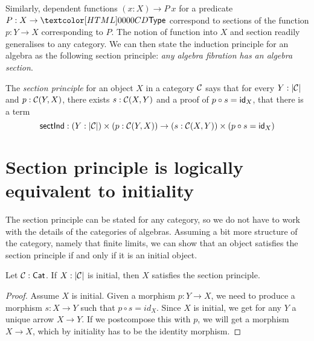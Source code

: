Similarly, dependent functions $(x : X) \to P\ x$ for a predicate
$P : X \to \Type$ correspond to sections of the function $p : Y \to X$
corresponding to $P$. The notion of function into $X$ and section
readily generalises to any category. We can then state the induction
principle for an algebra as the following section principle: \emph{any
  algebra fibration has an algebra section}.

\begin{definition}
  The \emph{section principle} for an object $X$ in a category $\mathcal{C}$
  says that for every $Y : | \mathcal{C} |$ and $p : \mathcal{C}(Y,X)$, there exists
  $s : \mathcal{C}(X,Y)$ and a proof of $p \circ s = \mathsf{id}_X$, \ie that there is
  a term
  \[
    \mathsf{sectInd} : (Y : | \mathcal{C} |) \times (p : \mathcal{C}(Y,X)) \to (s : \mathcal{C}(X,Y)) \times (p \circ s = \mathsf{id}_X)
  \]
\end{definition}

\section{Section principle is logically equivalent to initiality}

The section principle can be stated for any category, so we do not
have to work with the details of the categories of algebras. Assuming
a bit more structure of the category, namely that finite limits, we
can show that an object satisfies the section principle if and only if
it is an initial object.

\begin{lemma}
\label{thm:initToSec}
  Let $\mathcal{C}: \mathsf{Cat}$. If $X : | \mathcal{C} |$ is initial, then $X$ satisfies the
  section principle.
\end{lemma}
\begin{proof}
  Assume $X$ is initial. Given a morphism $p : Y \to X$, we need to
  produce a morphism $s : X \to Y$ such that $p \circ s = id_X$.
  Since $X$ is initial, we get for any $Y$ a unique arrow $X \to
  Y$. If we postcompose this with $p$, we will get a morphism
  $X \to X$, which by initiality has to be the identity morphism.
\end{proof}

